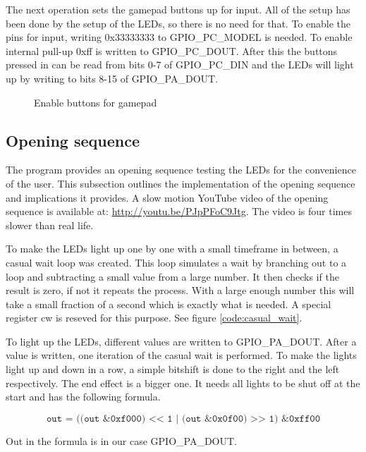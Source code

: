 The next operation sets the gamepad buttons up for input. All of the setup has been done by the setup of the LEDs, so there is no need for that. To enable the pins for input, writing 0x33333333 to GPIO\_PC\_MODEL is needed. To enable internal pull-up 0xff is written to GPIO\_PC\_DOUT. After this the buttons pressed in can be read from bits 0-7 of GPIO\_PC\_DIN and the LEDs will light up by writing to bits 8-15 of GPIO\_PA\_DOUT.

\begin{figure}[h!]
\caption{Enable buttons for gamepad}
\label{code:set_drive_gpio_o}
\end{figure}

\subsection{Opening sequence}
\label{subsec:dev_pros_opening_seq}

The program provides an opening sequence testing the LEDs for the convenience of the user. This subsection outlines the implementation of the opening sequence and implications it provides. A slow motion YouTube video of the opening sequence is available at: \url{http://youtu.be/PJpPFoC9Jtg}. The video is four times slower than real life.

To make the LEDs light up one by one with a small timeframe in between, a casual wait loop was created. This loop simulates a wait by branching out to a loop and subtracting a small value from a large number. It then checks if the result is zero, if not it repeats the process. With a large enough number this will take a small fraction of a second which is exactly what is needed. A special register cw is reseved for this purpose. See figure \ref{code:casual_wait}.

To light up the LEDs, different values are written to GPIO\_PA\_DOUT. After a value is written, one iteration of the casual wait is performed. To make the lights light up and down in a row, a simple bitshift is done to the right and the left respectively. The end effect is a bigger one. It needs all lights to be shut off at the start and has the following formula.

$$ \texttt{out = ((out \& 0xf000) << 1 | (out \& 0x0f00) >> 1) \& 0xff00} $$

Out in the formula is in our case GPIO\_PA\_DOUT.


